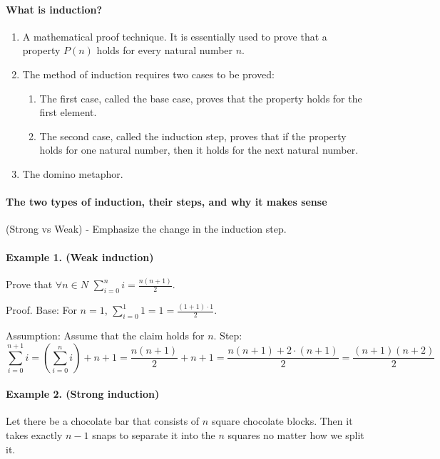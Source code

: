 \paragraph{What is induction?}
\begin{enumerate}
    \item A mathematical proof technique. It is essentially used to prove that a property \(P(n)\) holds for every natural number \(n\).
    \item The method of induction requires two cases to be proved:
    \begin{enumerate}
        \item The first case, called the base case, proves that the property holds for the first element.
        \item The second case, called the induction step, proves that if the property holds for one natural number, then it holds for the next natural number.
    \end{enumerate}
    \item The domino metaphor. 
\end{enumerate}
\paragraph{The two types of induction, their steps, and why it makes sense} (Strong vs Weak) - Emphasize the change in the induction step.
\paragraph{Example 1. (Weak induction)} Prove that \( \forall n \in  N \)
\( \sum_{i=0}^{n}{i} = \frac{n(n+1)}{2} \).


Proof. Base: For \(n = 1\), \(\sum_{i=0}^{1}{1} = 1 = \frac{(1+1)\cdot 1}{2} \).

Assumption: Assume that the claim holds for \(n\).
Step: 
\begin{equation*}
 \sum_{i=0}^{n+1}{i} = \left( \sum_{i=0}^{n}{i} \right) + n+1 = \frac{n(n+1)}{2} + n + 1 = \frac{n(n+1) + 2\cdot (n+1)}{2} = \frac{(n+1)(n+2)}{2} 
\end{equation*}


\paragraph{Example 2. (Strong induction)} Let there be a chocolate bar that consists of \(n\) square chocolate blocks. Then it takes exactly \(n - 1\) snaps to separate it into the \(n\) squares no matter how we split it.


